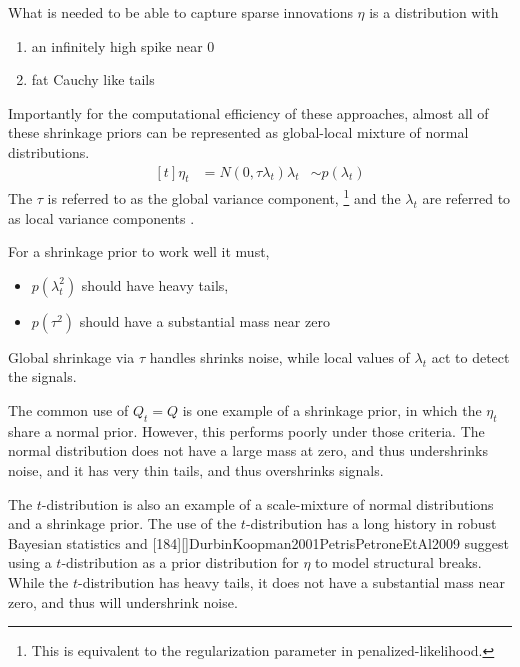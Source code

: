 \documentclass{article}
\begin{document}
What is needed to be able to capture sparse innovations $\eta$ is a distribution with 
\begin{enumerate}
\item an infinitely high spike near 0
\item fat Cauchy like tails
\end{enumerate}

Importantly for the computational efficiency of these approaches, almost all of these shrinkage priors can be represented as global-local mixture of normal distributions.
\begin{equation}
  \label{eq:3}
  \begin{aligned}[t]
    \eta_{t} &= N(0, \tau \lambda_{t})
    \lambda_{t} &\sim p(\lambda_{t})
  \end{aligned}
\end{equation}
The $\tau$ is referred to as the global variance component,%
\footnote{This is equivalent to the regularization parameter in penalized-likelihood.}
and the $\lambda_{t}$ are referred to as local variance components \parencite{PolsonScott2010}.

For a shrinkage prior to work well it must,\parencite[5]{PolsonScott2010}
\begin{itemize}
\item $p(\lambda_{t}^{2})$ should have heavy tails,
\item $p(\tau^{2})$ should have a substantial mass near zero
\end{itemize}
Global shrinkage via $\tau$ handles shrinks noise, while local values of $\lambda_{t}$ act to detect the signals.\parencite[5]{PolsonScott2010}

The common use of $Q_{t} = Q$ is one example of a shrinkage prior, in which the $\eta_{t}$ share a normal prior. 
However, this performs poorly under those criteria. 
The normal distribution does not have a large mass at zero, and thus undershrinks noise, and it has very thin tails, and thus overshrinks signals.

The $t$-distribution is also an example of a scale-mixture of normal distributions and a shrinkage prior.
The use of the $t$-distribution has a long history in robust Bayesian statistics and \textcite{HarveyKoopman2000}[184][]{DurbinKoopman2001}{PetrisPetroneEtAl2009} suggest using a $t$-distribution as a prior distribution for $\eta$ to model structural breaks.
While the $t$-distribution has heavy tails, it does not have a substantial mass near zero, and thus will undershrink noise.
\end{document}
